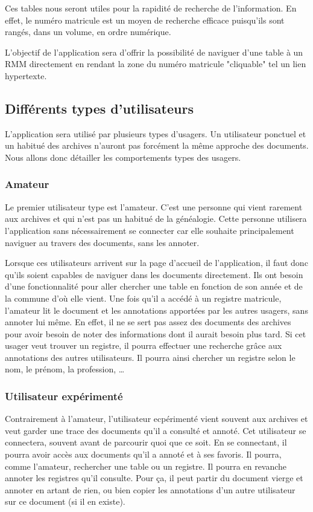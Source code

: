 \documentclass[a4paper]{article}
\begin{document}
Ces tables nous seront utiles pour la rapidité de recherche de l'information. En effet, le numéro matricule est un moyen de recherche efficace puisqu'ils sont rangés, dans un volume, en ordre numérique. 

L'objectif de l'application sera d'offrir la possibilité de naviguer d'une table à un RMM directement en rendant la zone du numéro matricule "cliquable" tel un lien hypertexte.

\subsection{Différents types d'utilisateurs}
L'application sera utilisé par plusieurs types d'usagers. Un utilisateur ponctuel et un habitué des archives n'auront pas forcément la même approche des documents. Nous allons donc détailler les comportements types des usagers.

\subsubsection{Amateur}
Le premier utilisateur type est l'amateur. C'est une personne qui vient rarement aux archives et qui n'est pas un habitué de la généalogie. Cette personne utilisera l'application sans nécessairement se connecter car elle souhaite principalement naviguer au travers des documents, sans les annoter.

Lorsque ces utilisateurs arrivent sur la page d'accueil de l'application, il faut donc qu'ils soient capables de naviguer dans les documents directement. Ils ont besoin d'une fonctionnalité pour aller chercher une table en fonction de son année et de la commune d'où elle vient. Une fois qu'il a accédé à un registre matricule, l'amateur lit le document et les annotations apportées par les autres usagers, sans annoter lui même. En effet, il ne se sert pas assez des documents des archives pour avoir besoin de noter des informations dont il aurait besoin plus tard. Si cet usager veut trouver un registre, il pourra effectuer une recherche grâce aux annotations des autres utilisateurs. Il pourra ainsi chercher un registre selon le nom, le prénom, la profession, \ldots

\subsubsection{Utilisateur expérimenté}
Contrairement à l'amateur, l'utilisateur ecpérimenté vient souvent aux archives et veut garder une trace des documents qu'il a consulté et annoté. Cet utilisateur se connectera, souvent avant de parcourir quoi que ce soit. En se connectant, il pourra avoir accès aux documents qu'il a annoté et à ses favoris. Il pourra, comme l'amateur, rechercher une table ou un registre. Il pourra en revanche annoter les registres qu'il consulte. Pour ça, il peut partir du document vierge et annoter en artant de rien, ou bien copier les annotations d'un autre utilisateur sur ce document (si il en existe).
\end{document}
